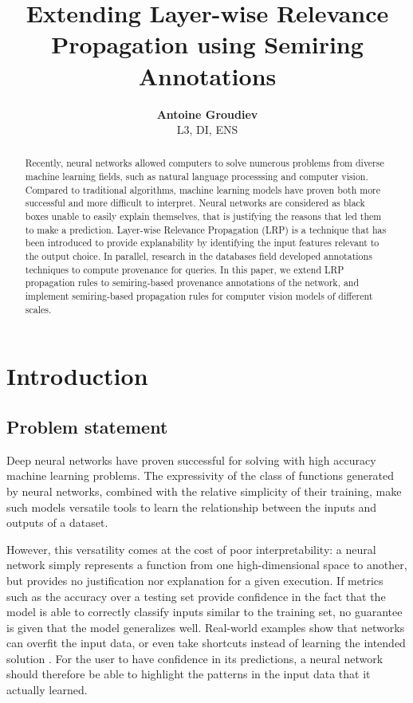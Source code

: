 \documentclass{../cs-classes/cs-classes}
\title{Extending Layer-wise Relevance Propagation using Semiring Annotations}
\author{
    \textbf{Antoine Groudiev}\\L3, DI, ENS
}
\date{}
\newcommand*{\1}{\digitsbb{1}}
\newcommand*{\0}{\digitsbb{0}}
\begin{document}
\begin{abstract}
    Recently, neural networks allowed computers to solve numerous problems from diverse machine learning fields, such as natural language processsing and computer vision. Compared to traditional algorithms, machine learning models have proven both more successful and more difficult to interpret. Neural networks are considered as black boxes unable to easily explain themselves, that is justifying the reasons that led them to make a prediction. Layer-wise Relevance Propagation (LRP) is a technique that has been introduced to provide explanability by identifying the input features relevant to the output choice. In parallel, research in the databases field developed annotations techniques to compute provenance for queries. In this paper, we extend LRP propagation rules to semiring-based provenance annotations of the network, and implement semiring-based propagation rules for computer vision models of different scales.
\end{abstract}

\section{Introduction}
\subsection{Problem statement}
Deep neural networks have proven successful for solving with high accuracy machine learning problems. The expressivity of the class of functions generated by neural networks, combined with the relative simplicity of their training, make such models versatile tools to learn the relationship between the inputs and outputs of a dataset.

However, this versatility comes at the cost of poor interpretability: a neural network simply represents a function from one high-dimensional space to another, but provides no justification nor explanation for a given execution. If metrics such as the accuracy over a testing set provide confidence in the fact that the model is able to correctly classify inputs similar to the training set, no guarantee is given that the model generalizes well. Real-world examples show that networks can overfit the input data, or even take shortcuts instead of learning the intended solution \cite{shortcuts}. For the user to have confidence in its predictions, a neural network should therefore be able to highlight the patterns in the input data that it actually learned.
\end{document}
